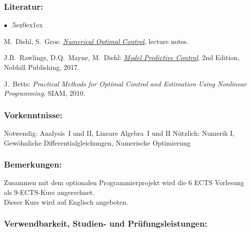 \documentclass[a4paper,10pt]{article}
\renewenvironment{itemize}{\begin{list}{$\bullet$\ }{\itemsep.5ex\setlength{\topsep}{0.5\itemsep}\parsep0ex\labelsep1ex\settowidth{\labelwidth}{$\bullet$\ }\setlength{\leftmargin}{\labelwidth}\addtolength{\leftmargin}{3ex}\addtolength{\leftmargin}{\labelsep}}}{\end{list}}
\begin{document}
\subsubsection*{\large
    Literatur:
}
\begin{itemize}
\item
 M.~Diehl, S.~Gros: \href{https://www.syscop.de/files/2020ss/NOC/book-NOCSE.pdf}{\emph{Numerical Optimal Control}}, lecture notes. 
\item
J.B.~Rawlings, D.Q.~Mayne, M.~Diehl: \href{https://sites.engineering.ucsb.edu/\~jbraw/mpc/MPC-book-2nd-edition-4th-printing.pdf}{\emph{Model Predictive Control}}, 2nd Edition, Nobhill Publishing, 2017.
\item
J.~Betts: \emph{Practical Methods for Optimal Control and Estimation Using Nonlinear Programming}, SIAM, 2010.
\end{itemize}
\subsubsection*{\large
    Vorkenntnisse:
}
Notwendig: Analysis~I und II, Lineare Algebra~I und II Nützlich: Numerik I, Gewöhnliche Differentialgleichungen, Numerische Optimierung
\subsubsection*{\large
    Bemerkungen:
}
Zusammen mit dem optionalen Programmierprojekt wird die 6 ECTS Vorlesung als 9-ECTS-Kurs angerechnet.\\
Dieser Kurs wird auf Englisch angeboten.
\subsubsection*{\large
    Verwendbarkeit, Studien- und Prüfungsleistungen:
}
\end{document}
